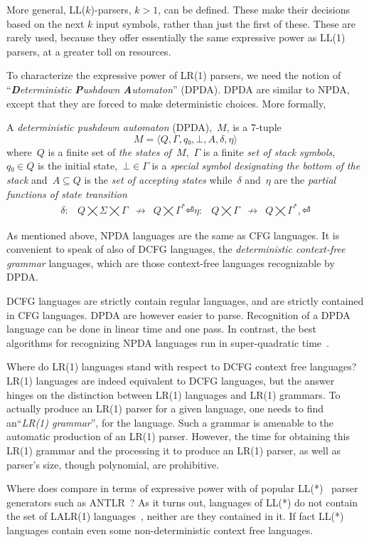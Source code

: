 More general, LL($k$)-parsers, $k>1$, can be defined. These make their
  decisions based on the next $k$ input symbols, rather than just the first of these.
These are rarely used, because they offer essentially the same expressive power as 
  LL(1) parsers, at a greater toll on resources. 

To characterize the expressive power of LR(1) parsers, we need the notion 
of ``\emph{\textbf Deterministic \textbf Pushdown \textbf Automaton}'' (DPDA). 
DPDA are similar to NPDA, except that they are forced 
  to make deterministic choices.
More formally, 
\begin{Definition}
  \label{Definition:DPDA}
  A \emph{deterministic pushdown automaton} (DPDA),~$M$, is a 7-tuple
  \[
    M =⟨Q,Γ, q₀,⊥, A,δ,η⟩
  \]
  where~$Q$ is a finite set of
  \emph{the states of~$M$},~$Γ$ is a finite
  \emph{set of stack symbols},~$q₀∈Q$ is the initial state,~$⊥∈Γ$
  is a \emph{special symbol designating the bottom of the stack}
  and~$A⊆Q$ is the \emph{set of accepting states} while~$δ$ and~$η$ are
  the \emph{partial functions of state transition}
  \[
    \begin{array}{crlc}
      δ: & Q⨉Σ⨉Γ &↛& Q⨉Γ^*⏎
      η: & Q⨉Γ &↛& Q⨉Γ^*,⏎
    \end{array}
  \]
\end{Definition}

As mentioned above, NPDA languages are the same as CFG languages.
It is convenient to speak of also of DCFG languages, the \emph{deterministic context-free grammar} languages, 
  which are those context-free languages recognizable by DPDA.
  
DCFG languages are strictly contain regular languages, and are strictly contained
  in CFG languages.
DPDA are however easier to parse. Recognition of a DPDA language 
  can be done in linear time and one pass.
  In contrast, the best algorithms for recognizing NPDA languages run in super-quadratic time~\cite{CYK,I forget the nnames}. 

Where do LR(1) languages stand with respect to DCFG context free languages? 
LR(1) languages are indeed equivalent to DCFG languages, but 
the answer hinges on the distinction 
  between LR(1) languages and LR(1) grammars. 
To actually produce an LR(1) parser for a given language, 
  one needs to find an``\emph{LR(1) grammar}'', for the language.
Such a grammar is amenable to 
  the automatic production of an LR(1) parser.
However, the time for obtaining this LR(1) grammar and the processing it to produce an LR(1) parser,
  as well as parser's size, 
  though polynomial, are prohibitive. 

Where does \Self compare in terms of expressive power with of popular LL(*)~\cite{Parr:2011-is this where it was introduced? I doubt it was so soon} parser generators such 
  as ANTLR~\cite{ANTLR}?
  As it turns out, languages of LL(*) do not contain the set of LALR(1) languages~\cite{Tomer check this}, 
neither are they contained in it. If fact LL(*) languages 
  contain even some non-deterministic context free languages. 
